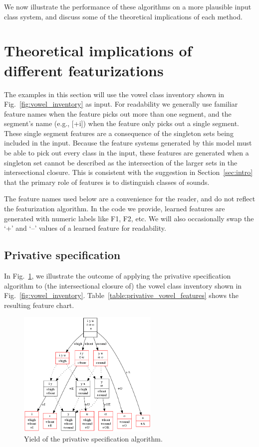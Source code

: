 \documentclass[12pt, oneside]{article}   	%
\newcommand{\featmat}[1]
{$[$#1$]$}
\begin{document}
We now illustrate the performance of these algorithms on a more plausible input class system, and discuss some of the theoretical implications of each method.

\FloatBarrier
\section{Theoretical implications of different featurizations}
\label{sec:theoretical_implications}

The examples in this section will use the vowel class inventory shown in Fig.~\ref{fig:vowel_inventory} as input. For readability we generally use familiar feature names when the feature picks out more than one segment, and the segment's name (e.g., \featmat{+i}) when the feature only picks out a single segment. These single segment features are a consequence of the singleton sets being included in the input. Because the feature systems generated by this model must be able to pick out every class in the input, these features are generated when a singleton set cannot be described as the intersection of the larger sets in the intersectional closure. This is consistent with the suggestion in Section~\ref{sec:intro} that the primary role of features is to distinguish classes of sounds.

The feature names used below are a convenience for the reader, and do not reflect the featurization algorithm. In the code we provide, learned features are generated with numeric labels like F1, F2, etc. We will also occasionally swap the `+' and `--' values of a learned feature for readability.

\subsection{Privative specification}

In Fig.~\ref{fig:privative}, we illustrate the outcome of applying the privative specification algorithm to (the intersectional closure of) the vowel class inventory shown in Fig.~\ref{fig:vowel_inventory}. Table~\ref{table:privative_vowel_features} shows the resulting feature chart.

\begin{figure}[htb!]
	\centering
	\includegraphics[width=0.6\textwidth]{vowel_inventory_privative.png}
	\caption{Yield of the privative specification algorithm.}
	\label{fig:privative}
\end{figure}
\end{document}
